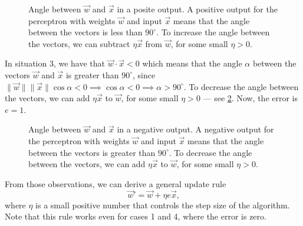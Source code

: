 \begin{figure}
  \centering
  \caption{
  Angle between $\vec{w}$ and $\vec{x}$ in a posite output.
  A positive output for the perceptron with weights $\vec{w}$ and input $\vec{x}$ means
  that the angle between the vectors is less than $90^\circ$.  To increase the angle
  between the vectors, we can subtract $\eta\vec{x}$ from $\vec{w}$, for some small $\eta
  > 0$.
  }
  \label{fig:perceptron-w2}
\end{figure}

In situation 3, we have that $\vec{w} \cdot \vec{x} < 0$ which means that the
angle $\alpha$ between the vectors $\vec{w}$ and $\vec{x}$ is greater than $90^\circ$,
since $\|\vec{w}\|\|\vec{x}\|\cos\alpha < 0 \implies \cos\alpha < 0 \implies \alpha > 90^\circ$.
To decrease the angle between the vectors, we can add $\eta\vec{x}$ to $\vec{w}$, for
some small $\eta > 0$ --- see \cref{fig:perceptron-w3}.  Now, the error is $e = 1$.

\begin{figure}
  \centering
  \caption{
  Angle between $\vec{w}$ and $\vec{x}$ in a negative output.
  A negative output for the perceptron with weights $\vec{w}$ and input $\vec{x}$ means
  that the angle between the vectors is greater than $90^\circ$.  To decrease the angle
  between the vectors, we can add $\eta\vec{x}$ to $\vec{w}$, for some small $\eta
  > 0$.
  }
  \label{fig:perceptron-w3}
\end{figure}

From those observations, we can derive a general update rule
\[
  \vec{w}' = \vec{w} + \eta e \vec{x}\text{,}
\]
where $\eta$ is a small positive number that controls the step size of the algorithm.
Note that this rule works even for cases 1 and 4, where the error is zero.

